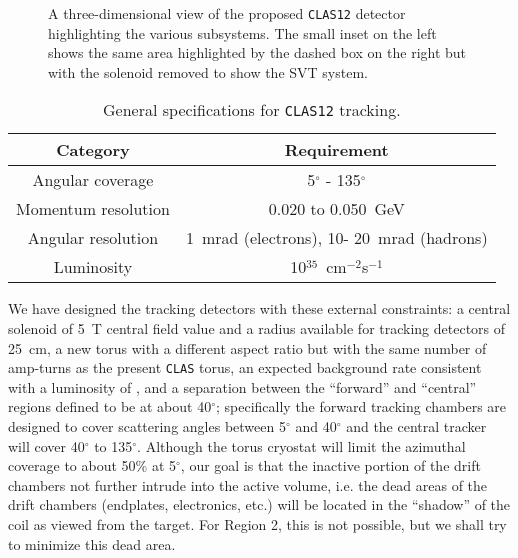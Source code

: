\begin{figure}[htbp]
\vspace{11.0cm}
\caption{\small{A three-dimensional view of the proposed {\tt CLAS12} 
detector highlighting the various subsystems.  The small inset on the left
shows the same area highlighted by the dashed box on the right but with
the solenoid removed to show the SVT system.}}
\label{clas12}
\end{figure}

\begin{table}[htbp]
\begin{center}
\begin{tabular} {||c|c||} \hline \hline
{\bf Category}      & {\bf Requirement} \\ \hline
Angular coverage    & 5$^{\circ}$ - 135$^{\circ}$ \\ \hline
Momentum resolution & 0.020 to 0.050~GeV          \\ \hline
Angular resolution  & 1~mrad (electrons), 10- 20~mrad (hadrons) \\ \hline
Luminosity     &  10$^{35}$~cm$^{-2}$s$^{-1}$ \\ \hline
\end{tabular}
\caption{\small{General specifications for {\tt CLAS12} tracking.}}
\label{tracker-specs}
\end{center}
\end{table}

We have designed the tracking detectors with these external constraints: 
a central solenoid of 5~T central field value and a radius available for 
tracking detectors of 25~cm, a new torus with a different aspect ratio 
but with the same number of amp-turns as the present {\tt CLAS} torus, 
an expected background rate consistent with a luminosity of , and a 
separation between the ``forward'' and ``central'' regions defined to be 
at about 40$^{\circ}$; specifically the forward tracking chambers are 
designed to cover scattering angles between 5$^{\circ}$ and 40$^{\circ}$ 
and the central tracker will cover 40$^{\circ}$ to 135$^{\circ}$.  Although 
the torus cryostat will limit the azimuthal coverage to about 50\% at 
5$^{\circ}$, our goal is that the inactive portion of the drift chambers 
not further intrude into the active volume, i.e. the dead areas of the drift 
chambers (endplates, electronics, etc.) will be located in the ``shadow'' of 
the coil as viewed from the target.  For Region 2, this is not possible, but 
we shall try to minimize this dead area.

